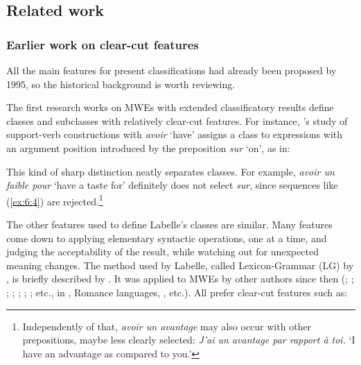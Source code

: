 \documentclass[output=paper]{langsci/langscibook}
\begin{document}
\subsection{Related work} 
\label{22}

\subsubsection{Earlier work on clear-cut features}
\label{earlierworkonfeatures}

All the main features for present classifications had already been proposed by 1995, so the historical background is worth reviewing. 

The first research works on MWEs with extended classificatory results define classes and subclasses with relatively clear-cut features. For instance, \citet{Labelle1974}'s study of  support-verb constructions with \textit{avoir} ‘have’ assigns a class to expressions with an argument position introduced by the preposition \textit{sur} ‘on’, as in: 

\begin{exe}
\end{exe}

\noindent This kind of sharp distinction neatly separates classes. For example, \textit{avoir un faible pour} ‘have a taste for’ definitely does not select \textit{sur}, since sequences like (\ref{ex:6:4}) are rejected.\footnote{Independently of that, \textit{avoir un avantage} may also occur with other prepositions, maybe less clearly selected: \textit{J’ai un avantage par rapport à toi.} ‘I have an advantage as compared to you.’} 

\begin{exe}
\end{exe}

\noindent The other features used to define Labelle’s classes are similar. Many features come down to applying elementary syntactic operations, one at a time, and judging the acceptability of the result, while watching out for unexpected meaning changes. The method used by Labelle, called Lexicon-Grammar (LG) by \citet{Guillet}, is briefly described by \citet{Gross1994}. It was applied to MWEs by other authors since then (\citealt{Meunier1977}; \citealt{Giry-Schneider1978}; \citealt{Danlos1980}; \citealt{gross1982}; \citealt{Freckleton1985}; \citealt{Machonis1985}; \citealt{Ranchhod1990}; etc., in , Romance languages, , etc.). All prefer clear-cut features such as:
\end{document}
